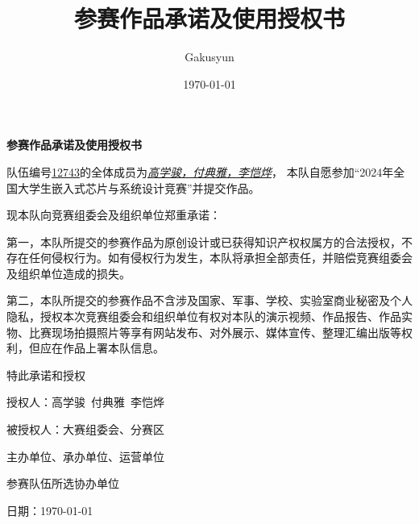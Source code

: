 \documentclass[UTF8]{ctexart}
\title{参赛作品承诺及使用授权书}
\author{Gakusyun}
\date{\today}
\begin{document}
{\centering\Large\textbf{参赛作品承诺及使用授权书}\par}
\vspace{1em}
{\large 队伍编号\underline{12743}的全体成员为\underline{\textit{高学骏，付典雅，李恺烨}}，
    本队自愿参加“2024年全国大学生嵌入式芯片与系统设计竞赛”并提交作品。

    现本队向竞赛组委会及组织单位郑重承诺：

    第一，本队所提交的参赛作品为原创设计或已获得知识产权权属方的合法授权，不存在任何侵权行为。如有侵权行为发生，本队将承担全部责任，并赔偿竞赛组委会及组织单位造成的损失。

    第二，本队所提交的参赛作品不含涉及国家、军事、学校、实验室商业秘密及个人隐私，授权本次竞赛组委会和组织单位有权对本队的演示视频、作品报告、作品实物、比赛现场拍摄照片等享有网站发布、对外展示、媒体宣传、整理汇编出版等权利，但应在作品上署本队信息。

    特此承诺和授权

    \noindent
    \begin{minipage}[t]{\dimexpr0.5\linewidth-0.34\columnsep}
    \end{minipage}
    \hfill
    \begin{minipage}[t]{\dimexpr0.66\linewidth}
        授权人：高学骏\ 付典雅\ 李恺烨

        被授权人：大赛组委会、分赛区

        \hspace*{5em}主办单位、承办单位、运营单位

        \hspace*{5em}参赛队伍所选协办单位

        日期：\today

    \end{minipage}}
\end{document}
